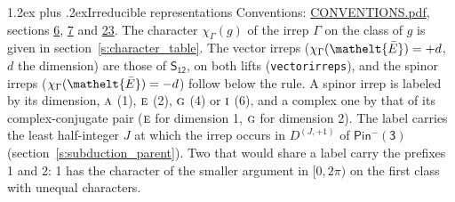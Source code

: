 \documentclass[10pt,a4paper]{article}
\makeatletter
\renewcommand\section{\@startsection{section}{1}{\z@}{-3ex plus -1ex minus -.2ex}%
  {1.2ex plus .2ex}{\normalfont\large\sffamily\bfseries\color{parttitle}}}
\numberwithin{equation}{section}
\newcommand{\eltfont}[1]{{\let\sigma\eltsigma\mathelt{#1}}}
\newcommand{\grp}[1]{\mathsf{#1}}
\newcommand{\irr}[1]{\text{\normalfont\scshape #1}}
\newcommand{\elt}[1]{\eltfont{#1}}
\newcommand{\irrJp}[2]{D^{(#1,#2)}}
\newcommand{\irchar}[1]{\chi_{#1}}
\newcommand{\barred}[1]{\bar{#1}}
\makeatother
\begin{document}
\section{Irreducible representations}\label{s:irreps}
Conventions: \href{../../CONVENTIONS.pdf}{CONVENTIONS.pdf}, sections \href{../../../rotation/CONVENTIONS.pdf\#conv.6}{6}, \href{../../../rotation/CONVENTIONS.pdf\#conv.7}{7} and \href{../../CONVENTIONS.pdf\#conv.23}{23}.
\leavevmode\label{n:function.character}\label{n:irrep.Gamma}The character $\irchar{\Gamma}(g)$ of the irrep $\Gamma$ on the class of $g$ is given in section~\ref{s:character_table}. \label{n:index.dimension}The vector irreps ($\irchar{\Gamma}(\elt{\barred{E}}) = +d$, $d$ the dimension) are those of \href{../../../rotation/data/pdf/S12.pdf}{$\grp{S_{12}}$}, on both lifts (\texttt{vectorirreps}), and the spinor irreps ($\irchar{\Gamma}(\elt{\barred{E}}) = -d$) follow below the rule. A spinor irrep is labeled by its dimension, $\irr{a}$ (1), $\irr{e}$ (2), $\irr{g}$ (4) or $\irr{i}$ (6), and a complex one by that of its complex-conjugate pair ($\irr{e}$ for dimension 1, $\irr{g}$ for dimension 2). The label carries the least half-integer $J$ at which the irrep occurs in $\irrJp{J}{+1}$ of $\grp{Pin^{-}(3)}$ (section~\ref{s:subduction_parent}). Two that would share a label carry the prefixes 1 and 2: 1 has the character of the smaller argument in $[0, 2\pi)$ on the first class with unequal characters.
\end{document}
